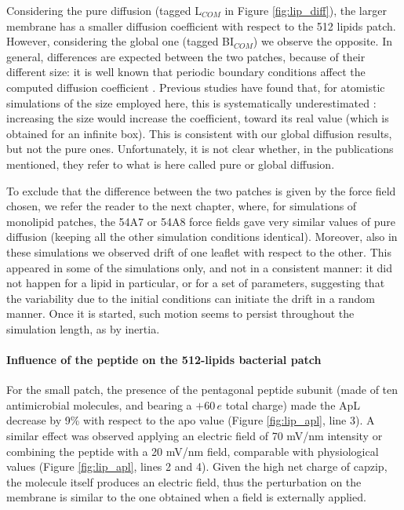 Considering the pure diffusion (tagged L$_{COM}$ in Figure \ref{fig:lip_diff}), the larger membrane has a smaller diffusion coefficient with respect to the 512 lipids patch. However, considering the global one (tagged BI$_{COM}$) we observe the opposite.
%
In general, differences are expected between the two patches, because of their different size: it is well known that periodic boundary conditions affect the computed diffusion coefficient \citep{Camley2015,Venable2017}. Previous studies have found that, for atomistic simulations of the size employed here, this is systematically underestimated \citep{Camley2015}: increasing the size would increase the coefficient, toward its real value (which is obtained for an infinite box). This is consistent with our global diffusion results, but not the pure ones. Unfortunately, it is not clear whether, in the publications mentioned, they refer to what is here called pure or global diffusion.

To exclude that the difference between the two patches is given by the force field chosen, we refer the reader to the next chapter, where, for simulations of monolipid patches, the 54A7 or 54A8 force fields gave very similar values of pure diffusion (keeping all the other simulation conditions identical).
%
Moreover, also in these simulations we observed drift of one leaflet with respect to the other. This appeared in some of the simulations only, and not in a consistent manner: it did not happen for a lipid in particular, or for a set of parameters, suggesting that the variability due to the initial conditions can initiate the drift in a random manner.
Once it is started, such motion seems to persist throughout the simulation length, as by inertia.


\paragraph{Influence of the peptide on the 512-lipids bacterial patch}
For the small patch, the presence of the pentagonal peptide subunit (made of ten antimicrobial molecules, and bearing a $+60\,e$ total charge) made the ApL decrease by 9\% with respect to the apo value (Figure \ref{fig:lip_apl}, line 3).
%
A similar effect was observed applying an electric field of 70 mV/nm intensity or combining the peptide with a 20 mV/nm field, comparable with physiological values (Figure \ref{fig:lip_apl}, lines 2 and 4).
%
Given the high net charge of capzip, the molecule itself produces an electric field, thus the perturbation on the membrane is similar to the one obtained when a field is externally applied.

